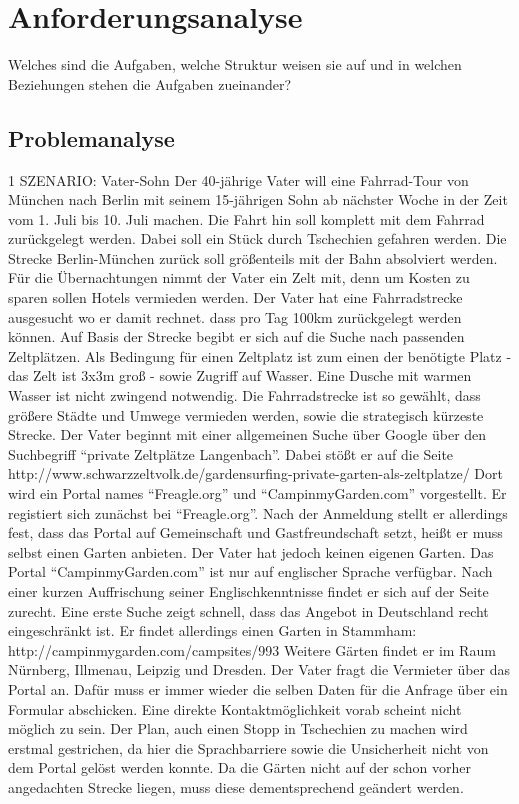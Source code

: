 
\section{Anforderungsanalyse}

Welches sind die Aufgaben, welche Struktur weisen sie auf und in welchen Beziehungen stehen die Aufgaben zueinander?

\subsection{Problemanalyse}

1 SZENARIO: Vater-Sohn
Der 40-jährige Vater will eine Fahrrad-Tour von München nach Berlin mit seinem 15-jährigen Sohn ab nächster Woche in der Zeit vom 1. Juli bis 10. Juli machen. Die Fahrt hin soll komplett mit dem Fahrrad zurückgelegt werden. Dabei soll ein Stück durch Tschechien gefahren werden. Die Strecke Berlin-München zurück soll größenteils mit der Bahn absolviert werden. Für die Übernachtungen nimmt der Vater ein Zelt mit, denn um Kosten zu sparen sollen Hotels vermieden werden.
Der Vater hat eine Fahrradstrecke ausgesucht wo er damit rechnet. dass pro Tag 100km zurückgelegt werden können. Auf Basis der Strecke begibt er sich auf die Suche nach passenden Zeltplätzen. Als Bedingung für einen Zeltplatz ist zum einen der benötigte Platz - das Zelt ist 3x3m groß - sowie Zugriff auf Wasser. Eine Dusche mit warmen Wasser ist nicht zwingend notwendig.
Die Fahrradstrecke ist so gewählt, dass größere Städte und Umwege vermieden werden, sowie die strategisch kürzeste Strecke.
Der Vater beginnt mit einer allgemeinen Suche über Google über den Suchbegriff “private Zeltplätze Langenbach”. Dabei stößt er auf die Seite http://www.schwarzzeltvolk.de/gardensurfing-private-garten-als-zeltplatze/
Dort wird ein Portal names “Freagle.org” und “CampinmyGarden.com” vorgestellt. Er registiert sich zunächst bei “Freagle.org”. Nach der Anmeldung stellt er allerdings fest, dass das Portal auf Gemeinschaft und Gastfreundschaft setzt, heißt er muss selbst einen Garten anbieten. Der Vater hat jedoch keinen eigenen Garten.
Das Portal “CampinmyGarden.com” ist nur auf englischer Sprache verfügbar. Nach einer kurzen Auffrischung seiner Englischkenntnisse findet er sich auf der Seite zurecht. Eine erste Suche zeigt schnell, dass das Angebot in Deutschland recht eingeschränkt ist.
Er findet allerdings einen Garten in Stammham: http://campinmygarden.com/campsites/993
Weitere Gärten findet er im Raum Nürnberg, Illmenau, Leipzig und Dresden. Der Vater fragt die Vermieter über das Portal an. Dafür muss er immer wieder die selben Daten für die Anfrage über ein Formular abschicken. Eine direkte Kontaktmöglichkeit vorab scheint nicht möglich zu sein.
Der Plan, auch einen Stopp in Tschechien zu machen wird erstmal gestrichen, da hier die Sprachbarriere sowie die Unsicherheit nicht von dem Portal gelöst werden konnte.
Da die Gärten nicht auf der schon vorher angedachten Strecke liegen, muss diese dementsprechend geändert werden.

